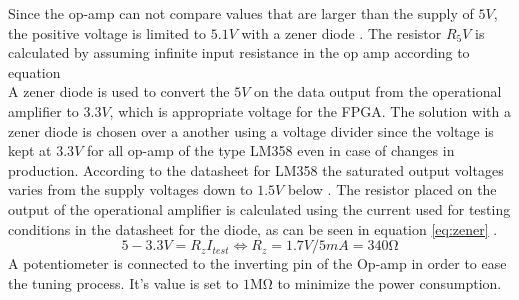 Since the op-amp can not compare values that are larger than the supply of $5V$, the positive voltage is limited to $5.1V$ with a zener diode \cite{zener}. The resistor $R_5V$ is calculated by assuming infinite input resistance in the op amp according to equation 
\begin{equation}
\label{eq:zener5VResistor}
\end{equation}
A zener diode \cite{zener} is used to convert the $5V$ on the data output from the operational amplifier to $3.3V$, which is appropriate voltage for the FPGA. The solution with a zener diode is chosen over a another using a voltage divider since the voltage is kept at $3.3V$ for all op-amp of the type LM358 even in case of changes in production. According to the datasheet for LM358 the saturated output voltages varies from the supply voltages down to $1.5V$ below \cite{lm358}.
The resistor placed on the output of the operational amplifier is calculated using the current used for testing conditions in the datasheet for the diode, as can be seen in equation \ref{eq:zener} \cite{zener}.
\begin{equation}
5-3.3V = R_{z} I_{test} \Leftrightarrow R_{z} = 1.7V/5mA = 340\si{\ohm}
\label{eq:zener}
\end{equation}
% 
A potentiometer is connected to the inverting pin of the Op-amp in order to ease the tuning process. It's value is set to $1\si{\mega\ohm}$ to minimize the power consumption.